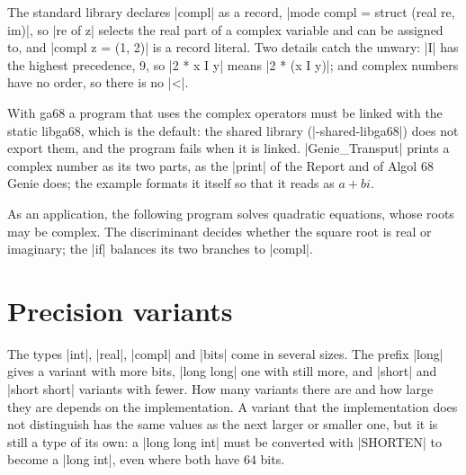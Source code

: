 The standard library declares \code|compl| as a record,
\code|mode compl = struct (real re, im)|, so \code|re of z| selects the
real part of a complex variable and can be assigned to, and
\code|compl z = (1, 2)| is a record literal. Two details catch the
unwary: \code|I| has the highest precedence, 9, so \code|2 * x I y| means
\code|2 * (x I y)|; and complex numbers have no order, so there is no
\code|<|.

\begin{implnote}
With ga68 a program that uses the complex operators must be linked with
the static libga68, which is the default: the shared library
(\code|-shared-libga68|) does not export them, and the program fails when
it is linked. \code|Genie_Transput| prints a complex number as its two
parts, as the \code|print| of the Report and of Algol 68 Genie does; the
example formats it itself so that it reads as $a + bi$.
\end{implnote}

As an application, the following program solves quadratic equations,
whose roots may be complex. The discriminant decides whether the square
root is real or imaginary; the \code|if| balances its two branches to
\code|compl|.


\section{Precision variants}\label{sec-long}

The types \code|int|, \code|real|, \code|compl| and \code|bits| come in
several sizes. The prefix \code|long| gives a variant with more bits,
\code|long long| one with still more, and \code|short| and
\code|short short| variants with fewer. How many variants there are and
how large they are depends on the implementation. A variant that the
implementation does not distinguish has the same values as the next
larger or smaller one, but it is still a type of its own: a
\code|long long int| must be converted with \code|SHORTEN| to become a
\code|long int|, even where both have 64 bits.

